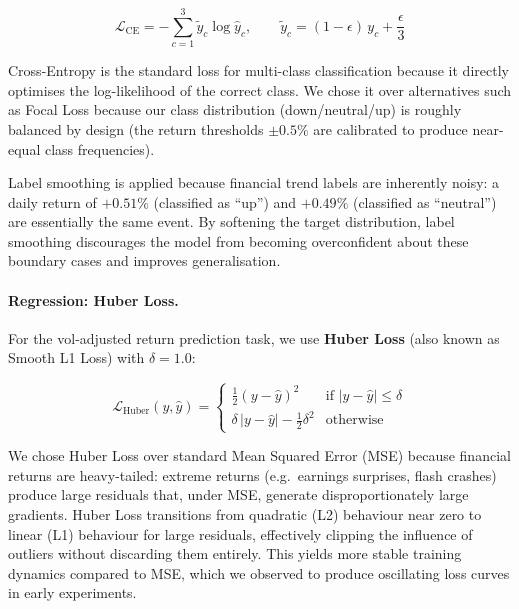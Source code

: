 \begin{equation}
  \mathcal{L}_{\text{CE}} = -\sum_{c=1}^{3}
    \tilde{y}_c \log \hat{y}_c, \qquad
  \tilde{y}_c = (1 - \epsilon)\, y_c + \frac{\epsilon}{3}
  \label{eq:ce-loss}
\end{equation}

Cross-Entropy is the standard loss for multi-class classification because it
directly optimises the log-likelihood of the correct class.  We chose it over
alternatives such as Focal Loss because our class distribution (down/neutral/up)
is roughly balanced by design (the return thresholds $\pm 0.5\%$ are calibrated
to produce near-equal class frequencies).

Label smoothing is applied because financial trend labels are inherently noisy:
a daily return of $+0.51\%$ (classified as ``up'') and $+0.49\%$ (classified as
``neutral'') are essentially the same event.  By softening the target
distribution, label smoothing discourages the model from becoming overconfident
about these boundary cases and improves generalisation.

\paragraph{Regression: Huber Loss.}
For the vol-adjusted return prediction task, we use \textbf{Huber Loss} (also
known as Smooth L1 Loss) with $\delta = 1.0$:

\begin{equation}
  \mathcal{L}_{\text{Huber}}(y, \hat{y}) =
  \begin{cases}
    \frac{1}{2}(y - \hat{y})^2 & \text{if } |y - \hat{y}| \leq \delta \\
    \delta\, |y - \hat{y}| - \frac{1}{2}\delta^2 & \text{otherwise}
  \end{cases}
  \label{eq:huber-loss}
\end{equation}

We chose Huber Loss over standard Mean Squared Error (MSE) because financial
returns are heavy-tailed: extreme returns (e.g.\ earnings surprises, flash
crashes) produce large residuals that, under MSE, generate disproportionately
large gradients.  Huber Loss transitions from quadratic (L2) behaviour near
zero to linear (L1) behaviour for large residuals, effectively clipping the
influence of outliers without discarding them entirely.  This yields more
stable training dynamics compared to MSE, which we observed to produce
oscillating loss curves in early experiments.

